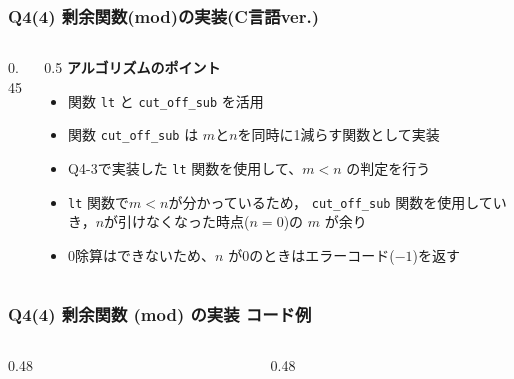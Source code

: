 \begin{frame}[fragile]
\frametitle{Q4(4) 剰余関数(mod)の実装(C言語ver.)}
    \begin{columns}[c]
        
        \begin{column}{0.45\textwidth}
            
        \end{column}
        
        \begin{column}{0.5\textwidth}
            \small
            \textbf{アルゴリズムのポイント}
            \begin{itemize}
                \item 関数 \texttt{lt} と \texttt{cut\_off\_sub} を活用
                \item 関数 \texttt{cut\_off\_sub} は $m$と$n$を同時に1減らす関数として実装
                \item Q4-3で実装した \texttt{lt} 関数を使用して、$m < n$ の判定を行う
                \item \texttt{lt} 関数で$m < n$が分かっているため，
                \texttt{cut\_off\_sub} 関数を使用していき，$n$が引けなくなった時点($n=0$)の $m$ が余り
                \item 0除算はできないため、$n$ が$0$のときはエラーコード($-1$)を返す

            \end{itemize}
        \end{column}
        
    \end{columns}
\end{frame}

\begin{frame}[fragile]
\frametitle{Q4(4) 剰余関数 (mod) の実装 コード例}
    \begin{columns}[t]
        
        \begin{column}{0.48\textwidth}
            
        \end{column}
        
        \begin{column}{0.48\textwidth}
            
        \end{column}
        
    \end{columns}
\end{frame}

